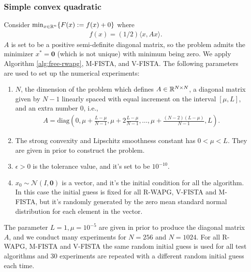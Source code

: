 \documentclass[12pt]{article}
\begin{document}
        \subsubsection{Simple convex quadratic}
            Consider $\min_{x \in \mathbb R^n} \{F(x):= f(x) + 0\}$ where
            \begin{align*}
                f(x) = (1/2)\langle x, A x\rangle.
            \end{align*}
            $A$ is set to be a positive semi-definite diagonal matrix, so the problem admits the minimizer $x^* = \mathbf 0$ (which is not unique) with minimum being zero.
            We apply Algorithm \ref{alg:free-rwapg}, M-FISTA, and V-FISTA.
            The following parameters are used to set up the numerical experiments:
            \begin{enumerate}
                \item $N$, the dimension of the problem which defines $A \in \mathbb R^{N\times N}$, a diagonal matrix given by $N- 1$ linearly spaced with equal increment on the interval $[\mu, L]$, and an extra number $0$, i.e.,
                \begin{align*}
                    A = \text{diag}
                    \left(0,
                        \mu + \frac{L - \mu}{N - 1},
                        \mu + 2\frac{L - \mu}{N - 1},
                        \ldots,
                        \mu + \frac{(N - 2)(L - \mu)}{N - 1},
                        L
                    \right).
                \end{align*}
                \item The strong convexity and Lipschitz smoothness constant has $0 < \mu < L$. They are given in prior to construct the problem.
                \item $\epsilon > 0$ is the tolerance value, and it's set to be $10^{-10}$.
                \item $x_0 \sim \mathcal N(I, \mathbf 0)$ is a vector, and it's the initial condition for all the algorithm. In this case the initial guess is fixed for all R-WAPG, V-FISTA and M-FISTA, but it's randomly generated by the zero mean standard normal distribution for each element in the vector.
            \end{enumerate}
            The parameter $L=1, \mu=10^{-5}$ are given in prior to produce the diagonal matrix $A$, and we conduct many experiments for $N = 256$ and $N = 1024$.
            For all R-WAPG, M-FISTA and V-FISTA the same random initial guess is used for all test algorithms and 30 experiments are repeated with a different random initial guess each time.
\end{document}
